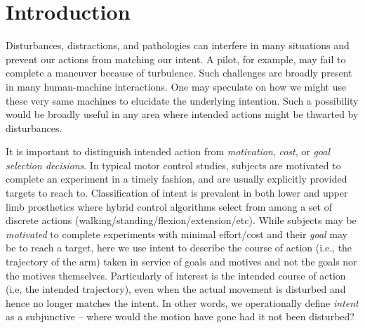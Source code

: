 

\section*{Introduction}
Disturbances, distractions, and pathologies can interfere in many situations and prevent our actions from matching our intent. A pilot, for example, may fail to complete a maneuver because of turbulence. Such challenges are broadly present in many human-machine interactions. One may speculate on how we might use these very same machines to elucidate the underlying intention. Such a possibility would be broadly useful in any area where intended actions might be thwarted by disturbances. 

It is important to distinguish intended action from \textit{motivation}\cite{mcclelland1985motives, rawolle2013relationships}, \textit{cost}\cite{todorov2002optimal, flash1985coordination}, or \textit{goal selection decisions}\cite{ziebart2010modeling}. In typical motor control studies, subjects are motivated to complete an experiment in a timely fashion, and are usually explicitly provided targets to reach to. Classification of intent is prevalent in both lower \cite{strausser2011development, hargrove2013robotic} and upper limb\cite{englehart2003robust, young2012improving} prosthetics where hybrid control algorithms select from among a set of discrete actions (walking/standing/flexion/extension/etc). While subjects may be \textit{motivated} to complete experiments with minimal effort/cost and their \textit{goal} may be to reach a target, here we use intent to describe the course of action (i.e., the trajectory of the arm) taken in service of goals and motives and not the goals nor the motives themselves. Particularly of interest is the intended course of action (i.e, the intended trajectory), even when the actual movement is disturbed and hence no longer matches the intent. In other words, we operationally define \textit{intent} as a subjunctive -- where would the motion have gone had it not been disturbed?

